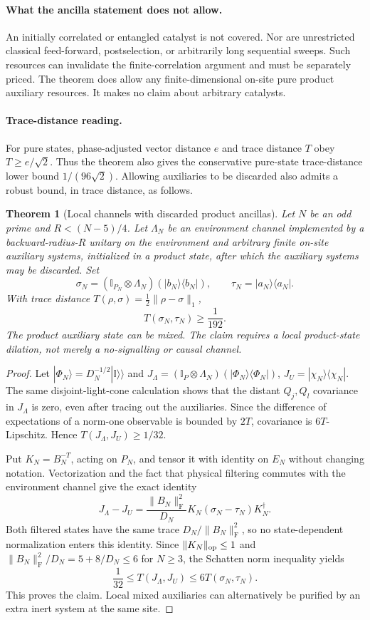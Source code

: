 \documentclass[11pt]{article}
\newtheorem{theorem}{Theorem}
\newcommand{\Id}{\mathbb I}
\newcommand{\F}{\mathrm F}
\begin{document}
\paragraph{What the ancilla statement does not allow.}
An initially correlated or entangled catalyst is not covered. Nor are unrestricted classical feed-forward, postselection, or arbitrarily long sequential sweeps. Such resources can invalidate the finite-correlation argument and must be separately priced. The theorem does allow any finite-dimensional on-site pure product auxiliary resources. It makes no claim about arbitrary catalysts.

\paragraph{Trace-distance reading.}
For pure states, phase-adjusted vector distance $e$ and trace distance $T$ obey $T\ge e/\sqrt2$. Thus the theorem also gives the conservative pure-state trace-distance lower bound $1/(96\sqrt2)$. Allowing auxiliaries to be discarded also admits a robust bound, in trace distance, as follows.

\begin{theorem}[Local channels with discarded product ancillas]
Let $N$ be an odd prime and $R<(N-5)/4$. Let $\Lambda_N$ be an environment channel implemented by a backward-radius-$R$ unitary on the environment and arbitrary finite on-site auxiliary systems, initialized in a product state, after which the auxiliary systems may be discarded. Set
\[
 \sigma_N=(\Id_{P_N}\otimes\Lambda_N)(|b_N\rangle\langle b_N|),\qquad
 \tau_N=|a_N\rangle\langle a_N|.
\]
With trace distance $T(\rho,\sigma)=\tfrac12\|\rho-\sigma\|_1$,
\[
 T(\sigma_N,\tau_N)\ge\frac1{192}.
\]
The product auxiliary state can be mixed. The claim requires a local product-state dilation, not merely a no-signalling or causal channel.
\end{theorem}
\begin{proof}
Let $|\Phi_N\rangle=D_N^{-1/2}|\Id\rangle\!\rangle$ and
$J_\Lambda=(\Id_P\otimes\Lambda_N)(|\Phi_N\rangle\langle\Phi_N|)$,
$J_U=|\chi_N\rangle\langle\chi_N|$.
The same disjoint-light-cone calculation shows that the distant $Q_j,Q_l$ covariance in $J_\Lambda$ is zero, even after tracing out the auxiliaries. Since the difference of expectations of a norm-one observable is bounded by $2T$, covariance is $6T$-Lipschitz. Hence $T(J_\Lambda,J_U)\ge1/32$.

Put $K_N=B_N^{-T}$, acting on $P_N$, and tensor it with identity on $E_N$ without changing notation. Vectorization and the fact that physical filtering commutes with the environment channel give the exact identity
\[
 J_\Lambda-J_U=\frac{\|B_N\|_\F^2}{D_N}
 K_N(\sigma_N-\tau_N)K_N^\dagger.
\]
Both filtered states have the same trace $D_N/\|B_N\|_\F^2$, so no state-dependent normalization enters this identity. Since $\|K_N\|_{\rm op}\le1$ and
$\|B_N\|_\F^2/D_N=5+8/D_N\le6$ for $N\ge3$, the Schatten norm inequality yields
\[
 \frac1{32}\le T(J_\Lambda,J_U)\le6T(\sigma_N,\tau_N).
\]
This proves the claim. Local mixed auxiliaries can alternatively be purified by an extra inert system at the same site.
\end{proof}
\end{document}
